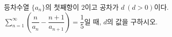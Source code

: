 등차수열 $\{a_n\}$의 첫째항이 $2$이고 공차가 $d\ (d>0)$이다. $\displaystyle\sum_{n=1}^{\infty}\left(\dfrac{n}{a_n}-\dfrac{n+1}{a_{n+1}}\right)=\dfrac{1}{5}$일 때, $d$의 값을 구하시오.
